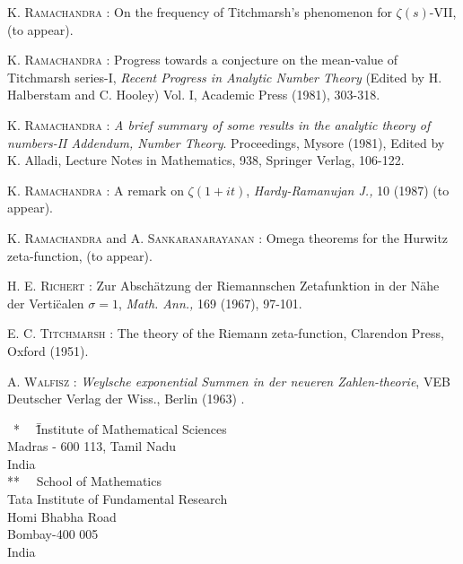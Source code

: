 \begin{thebibliography}{99}
  \textsc{K. Ramachandra} : On the frequency of Titchmarsh's phenomenon for $\zeta(s)$-VII, (to appear).

 \textsc{K. Ramachandra} : Progress towards a conjecture on the mean-value of Titchmarsh series-I, \textit{Recent Progress in Analytic Number Theory} (Edited by H. Halberstam and C. Hooley) Vol. I, Academic Press (1981), 303-318.

 \textsc{K. Ramachandra} : \textit{A brief summary of some results in the analytic theory of numbers-II Addendum, Number Theory}. Proceedings, Mysore (1981), Edited by K. Alladi, Lecture Notes in Mathematics, 938, Springer Verlag, 106-122.

 \textsc{K. Ramachandra} : A remark on $\zeta(1+ it)$, \textit{Hardy-Ramanujan J.,} 10 (1987) (to appear).

 \textsc{K. Ramachandra}  and \textsc{A. Sankaranarayanan} : Omega theorems for the Hurwitz zeta-function, (to appear).

 \textsc{H. E. Richert} : Zur Absch\"atzung der Riemannschen Zetafunktion in der N\"ahe der Verti\"calen $\sigma =1$, \textit{Math. Ann.,} 169 (1967), 97-101.

 \textsc{E. C. Titchmarsh} : The theory of the Riemann zeta-function, Clarendon Press, Oxford (1951).

 \textsc{A. Walfisz} : \textit{Weylsche exponential Summen in der neueren Zahlen-theorie}, VEB Deutscher Verlag der Wiss., Berlin (1963) .
\end{thebibliography}

\begin{tabbing}
~*~~ \= \= {\small Institute of Mathematical Sciences}\\
\> \> {\small Madras - 600 113, Tamil Nadu} \\
\> \> {\small India} \\
**~~ \> \> {\small School of Mathematics}\\
\> \> {\small Tata Institute of Fundamental Research}\\
\> \> {\small Homi Bhabha Road} \\
\> \> {\small Bombay-400 005}\\
\> \> {\small India}
\end{tabbing}




